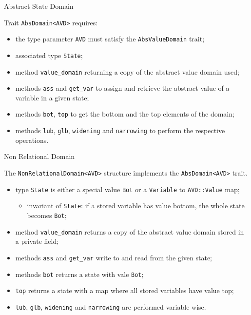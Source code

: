 \documentclass{beamer}
\begin{document}
\begin{frame}{Abstract State Domain}

    Trait \texttt{AbsDomain<AVD>} requires:
    \begin{itemize}
        \item the type parameter \texttt{AVD} must satisfy the \texttt{AbsValueDomain} trait;
        \item associated type \texttt{State};
        \item method \texttt{value\_domain} returning a copy of the abstract value domain used;
        \item methods \texttt{ass} and \texttt{get\_var} to assign and retrieve the abstract value of a variable in a given state;
        \item methods \texttt{bot}, \texttt{top} to get the bottom and the top elements of the domain;
        \item methods \texttt{lub}, \texttt{glb}, \texttt{widening} and \texttt{narrowing} to perform the respective operations.
    \end{itemize}

\end{frame}

\begin{frame}{Non Relational Domain}

    The \texttt{NonRelationalDomain<AVD>} structure implements the \texttt{AbsDomain<AVD>} trait.
    \begin{itemize}
        \item type \texttt{State} is either a special value \texttt{Bot} or a \texttt{Variable} to \texttt{AVD::Value} map;
              \begin{itemize}
                  \item invariant of \texttt{State}: if a stored variable has value bottom, the whole state becomes \texttt{Bot};
              \end{itemize}
        \item method \texttt{value\_domain} returns a copy of the abstract value domain stored in a private field;
        \item methods \texttt{ass} and \texttt{get\_var} write to and read from the given state;
        \item methods \texttt{bot} returns a state with vale \texttt{Bot};
        \item \texttt{top} returns a state with a map where all stored variables have value top;
        \item \texttt{lub}, \texttt{glb}, \texttt{widening} and \texttt{narrowing} are performed variable wise.
    \end{itemize}

\end{frame}
\end{document}
